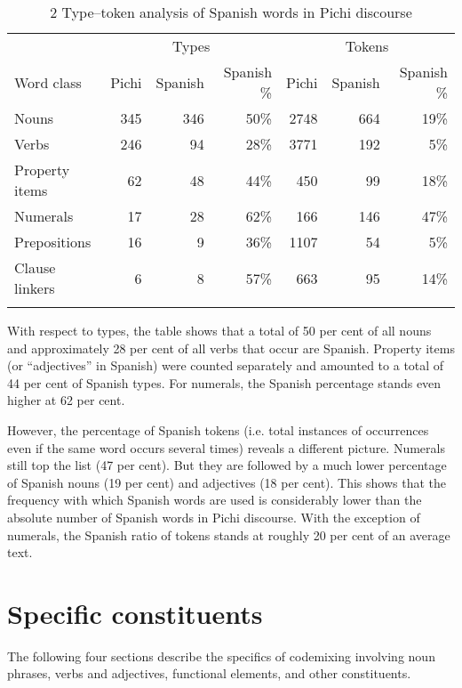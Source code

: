 \begin{table}
\caption{2 Type–token analysis of Spanish words in Pichi discourse}
\label{tab:key:13.2}

\begin{tabularx}{\textwidth}{l rrr rrr}
\lsptoprule
 & \multicolumn{3}{c}{ Types} & \multicolumn{3}{c}{ Tokens}\\
Word class & Pichi & Spanish & Spanish \% & Pichi & Spanish & Spanish \%\\
\midrule
Nouns & 345 & 346 & 50\% & 2748 & 664 & 19\%\\
Verbs & 246 & 94 & 28\% & 3771 & 192 & 5\%\\
Property items & 62 & 48 & 44\% & 450 & 99 & 18\%\\
Numerals & 17 & 28 & 62\% & 166 & 146 & 47\%\\
Prepositions & 16 & 9 & 36\% & 1107 & 54 & 5\%\\
Clause linkers & 6 & 8 & 57\% & 663 & 95 & 14\%\\
\lspbottomrule
\end{tabularx}
\end{table}
With respect to types, the table shows that a total of 50 per cent of all nouns and approximately 28 per cent of all verbs that occur are Spanish. Property items (or “adjectives” in Spanish) were counted separately and amounted to a total of 44 per cent of Spanish types. For numerals, the Spanish percentage stands even higher at 62 per cent. 


However, the percentage of Spanish tokens (i.e. total instances of occurrences even if the same word occurs several times) reveals a different picture. Numerals still top the list (47 per cent). But they are followed by a much lower percentage of Spanish nouns (19 per cent) and adjectives (18 per cent). This shows that the frequency with which Spanish words are used is considerably lower than the absolute number of Spanish words in Pichi discourse. With the exception of numerals, the Spanish ratio of tokens stands at roughly 20 per cent of an average text. 


\section{Specific constituents}\label{sec:13.2}

The following four sections describe the specifics of codemixing involving noun phrases, verbs and adjectives, functional elements, and other constituents.

